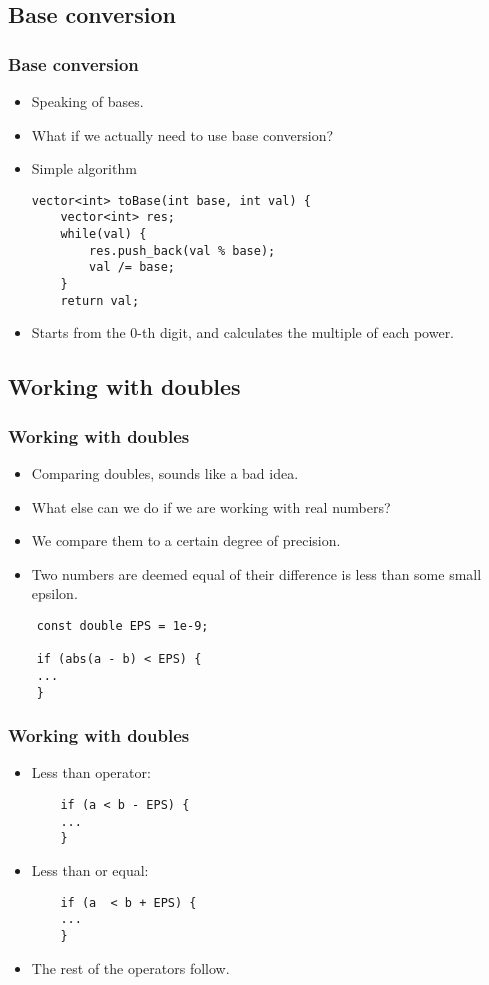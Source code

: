 \documentclass[10pt]{beamer}
\newcommand{\bi}{\begin{itemize}}
\newcommand{\ei}{\end{itemize}}
\begin{document}
\subsection{Base conversion}
\begin{frame}[fragile]
  \frametitle{Base conversion}
  \vspace{20pt}
  \bi
    \item Speaking of bases.
    \item What if we actually need to use base conversion?
    \item Simple algorithm
      \begin{verbatim}
vector<int> toBase(int base, int val) {
    vector<int> res;
    while(val) {
        res.push_back(val % base);
        val /= base;
    }
    return val;
      \end{verbatim}
    \item Starts from the $0$-th digit, and calculates the multiple of each power.
  \ei
\end{frame}

\subsection{Working with doubles}

\begin{frame}[fragile]
  \frametitle{Working with doubles}
  \vspace{30pt}
  \bi
    \item Comparing doubles, sounds like a bad idea.
    \item What else can we do if we are working with real numbers?
    \item We compare them to a certain degree of precision.
    \item Two numbers are deemed equal of their difference is less than some small epsilon.
  \ei

    \begin{verbatim}
    const double EPS = 1e-9;

    if (abs(a - b) < EPS) {
    ...
    }
    \end{verbatim}
\end{frame}

\begin{frame}[fragile]
  \frametitle{Working with doubles}
  \vspace{30pt}
  \bi
    \item Less than operator:
      \begin{verbatim}
    if (a < b - EPS) {
    ...
    }
      \end{verbatim}
    \item Less than or equal:
      \begin{verbatim}
    if (a  < b + EPS) {
    ...
    }
    \end{verbatim}
    \item The rest of the operators follow.
  \ei
\end{frame}
\end{document}
